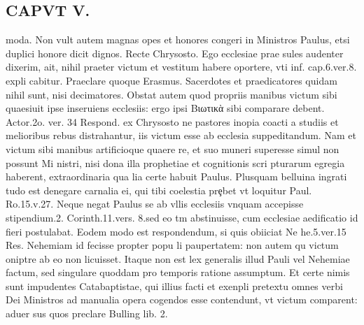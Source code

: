 \documentclass{article}
\begin{document}
\begin{pages}
\section*{CAPVT  V. }
\marginpar{[ p.307 ]}\pstart moda. Non vult autem magnas opes et honores congeri in Ministros Paulus, etsi duplici honore dicit dignos. Recte Chrysosto. Ego ecclesiae prae sules audenter dixerim, ait, nihil praeter victum et vestitum habere oportere, vti inf. cap.6.ver.8. expli cabitur. Praeclare quoque Erasmus. Sacerdotes et praedicatores quidam nihil sunt, nisi decimatores. Obstat autem quod propriis manibus victum sibi quaesiuit ipse inseruiens ecclesiis: ergo ipsi Βιωτικὰ sibi comparare debent. Actor.2o. ver. 34 Respond. ex Chrysosto ne pastores inopia coacti a studiis et melioribus rebus distrahantur, iis victum esse ab ecclesia suppeditandum. Nam et victum sibi manibus artificioque quaere re, et suo muneri superesse simul non possunt Mi nistri, nisi dona illa prophetiae et cognitionis scri pturarum egregia haberent, extraordinaria qua lia certe habuit Paulus. Plusquam belluina ingrati tudo est denegare carnalia ei, qui tibi coelestia prȩbet vt loquitur Paul. Ro.15.v.27. Neque negat Paulus se ab vllis ecclesiis vnquam accepisse stipendium.2. Corinth.11.vers. 8.sed eo tm abstinuisse, cum ecclesiae aedificatio id fieri postulabat. Eodem modo est respondendum, si quis obiiciat Ne he.5.ver.15 Res. Nehemiam id fecisse propter popu li paupertatem: non autem qu victum oniptre ab eo non licuisset. Itaque non est lex generalis illud Pauli vel Nehemiae factum, sed singulare quoddam pro temporis ratione assumptum. Et certe nimis sunt impudentes Catabaptistae, qui illius facti et exenpli pretextu omnes verbi Dei Ministros ad manualia opera cogendos esse contendunt, vt victum comparent: aduer sus quos preclare Bulling lib. 2.  \pend

\end{pages}
\end{document}
